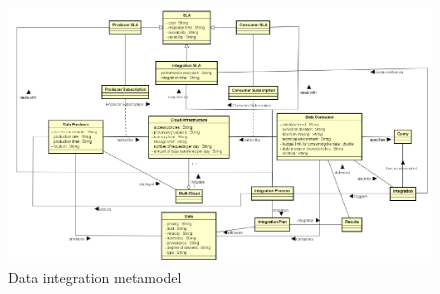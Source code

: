 \begin{figure}[th!]
\center
\includegraphics[scale=0.70]{metamodel.pdf}
\caption{Data integration metamodel}\label{fig:scenario}
\end{figure}


